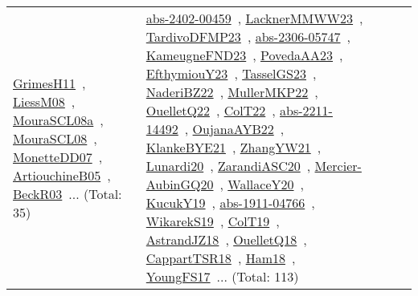 {\begin{longtable}{lp{3cm}>{\raggedright\arraybackslash}p{6cm}>{\raggedright\arraybackslash}p{6cm}>{\raggedright\arraybackslash}p{8cm}}
\href{works/GrimesH11.pdf}{GrimesH11}~\cite{GrimesH11}, \href{works/LiessM08.pdf}{LiessM08}~\cite{LiessM08}, \href{works/MouraSCL08a.pdf}{MouraSCL08a}~\cite{MouraSCL08a}, \href{works/MouraSCL08.pdf}{MouraSCL08}~\cite{MouraSCL08}, \href{works/MonetteDD07.pdf}{MonetteDD07}~\cite{MonetteDD07}, \href{works/ArtiouchineB05.pdf}{ArtiouchineB05}~\cite{ArtiouchineB05}, \href{works/BeckR03.pdf}{BeckR03}~\cite{BeckR03}... (Total: 35) & \href{works/abs-2402-00459.pdf}{abs-2402-00459}~\cite{abs-2402-00459}, \href{works/LacknerMMWW23.pdf}{LacknerMMWW23}~\cite{LacknerMMWW23}, \href{works/TardivoDFMP23.pdf}{TardivoDFMP23}~\cite{TardivoDFMP23}, \href{works/abs-2306-05747.pdf}{abs-2306-05747}~\cite{abs-2306-05747}, \href{works/KameugneFND23.pdf}{KameugneFND23}~\cite{KameugneFND23}, \href{works/PovedaAA23.pdf}{PovedaAA23}~\cite{PovedaAA23}, \href{works/EfthymiouY23.pdf}{EfthymiouY23}~\cite{EfthymiouY23}, \href{works/TasselGS23.pdf}{TasselGS23}~\cite{TasselGS23}, \href{works/NaderiBZ22.pdf}{NaderiBZ22}~\cite{NaderiBZ22}, \href{works/MullerMKP22.pdf}{MullerMKP22}~\cite{MullerMKP22}, \href{works/OuelletQ22.pdf}{OuelletQ22}~\cite{OuelletQ22}, \href{works/ColT22.pdf}{ColT22}~\cite{ColT22}, \href{works/abs-2211-14492.pdf}{abs-2211-14492}~\cite{abs-2211-14492}, \href{works/OujanaAYB22.pdf}{OujanaAYB22}~\cite{OujanaAYB22}, \href{works/KlankeBYE21.pdf}{KlankeBYE21}~\cite{KlankeBYE21}, \href{works/ZhangYW21.pdf}{ZhangYW21}~\cite{ZhangYW21}, \href{works/Lunardi20.pdf}{Lunardi20}~\cite{Lunardi20}, \href{works/ZarandiASC20.pdf}{ZarandiASC20}~\cite{ZarandiASC20}, \href{works/Mercier-AubinGQ20.pdf}{Mercier-AubinGQ20}~\cite{Mercier-AubinGQ20}, \href{works/WallaceY20.pdf}{WallaceY20}~\cite{WallaceY20}, \href{works/KucukY19.pdf}{KucukY19}~\cite{KucukY19}, \href{works/abs-1911-04766.pdf}{abs-1911-04766}~\cite{abs-1911-04766}, \href{works/WikarekS19.pdf}{WikarekS19}~\cite{WikarekS19}, \href{works/ColT19.pdf}{ColT19}~\cite{ColT19}, \href{works/AstrandJZ18.pdf}{AstrandJZ18}~\cite{AstrandJZ18}, \href{works/OuelletQ18.pdf}{OuelletQ18}~\cite{OuelletQ18}, \href{works/CappartTSR18.pdf}{CappartTSR18}~\cite{CappartTSR18}, \href{works/Ham18.pdf}{Ham18}~\cite{Ham18}, \href{works/YoungFS17.pdf}{YoungFS17}~\cite{YoungFS17}... (Total: 113)\\

\end{longtable}}
